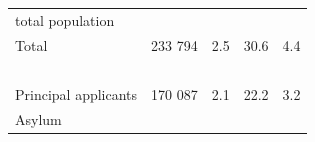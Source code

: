\documentclass[
]{article}
\begin{document}
\begin{longtable}[]{@{}lllll@{}}
\begin{minipage}[t]{0.17\columnwidth}
total
population\strut
\end{minipage}\tabularnewline
\begin{minipage}[t]{0.17\columnwidth}\raggedright
Total\strut
\end{minipage} & \begin{minipage}[t]{0.17\columnwidth}\raggedright
233 794\strut
\end{minipage} & \begin{minipage}[t]{0.17\columnwidth}\raggedright
2.5\strut
\end{minipage} & \begin{minipage}[t]{0.17\columnwidth}\raggedright
30.6\strut
\end{minipage} & \begin{minipage}[t]{0.17\columnwidth}\raggedright
4.4\strut
\end{minipage}\tabularnewline
\begin{minipage}[t]{0.17\columnwidth}\raggedright
~\strut
\end{minipage} & \begin{minipage}[t]{0.17\columnwidth}\raggedright
~\strut
\end{minipage} & \begin{minipage}[t]{0.17\columnwidth}\raggedright
~\strut
\end{minipage} & \begin{minipage}[t]{0.17\columnwidth}\raggedright
~\strut
\end{minipage} & \begin{minipage}[t]{0.17\columnwidth}\raggedright
~\strut
\end{minipage}\tabularnewline
\begin{minipage}[t]{0.17\columnwidth}\raggedright
Principal
applicants\strut
\end{minipage} & \begin{minipage}[t]{0.17\columnwidth}\raggedright
170 087\strut
\end{minipage} & \begin{minipage}[t]{0.17\columnwidth}\raggedright
2.1\strut
\end{minipage} & \begin{minipage}[t]{0.17\columnwidth}\raggedright
22.2\strut
\end{minipage} & \begin{minipage}[t]{0.17\columnwidth}\raggedright
3.2\strut
\end{minipage}\tabularnewline
\begin{minipage}[t]{0.17\columnwidth}\raggedright
Asylum

\end{minipage}
\end{longtable}
\end{document}
